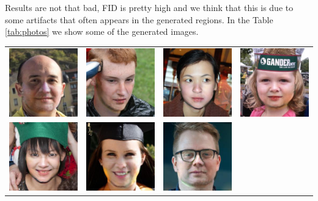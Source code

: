 \documentclass[10pt,twocolumn,letterpaper]{article}
\begin{document}
Results are not that bad, FID is pretty high and we think that this is due to
some artifacts that often appears in the generated regions.
In the Table \ref{tab:photos} we show some of the generated images.
\begin{table}
  \begin{tabular}{cccc}
    \includegraphics[width=.2\linewidth]{samples/00045.jpg}&
    \includegraphics[width=.2\linewidth]{samples/00053.jpg}&
    \includegraphics[width=.2\linewidth]{samples/00099.jpg}&
    \includegraphics[width=.2\linewidth]{samples/00146.jpg}\\
    \includegraphics[width=.2\linewidth]{samples/00202.jpg}&
    \includegraphics[width=.2\linewidth]{samples/00298.jpg}&
    \includegraphics[width=.2\linewidth]{samples/00353.jpg}&

\end{tabular}
\end{table}
\end{document}
